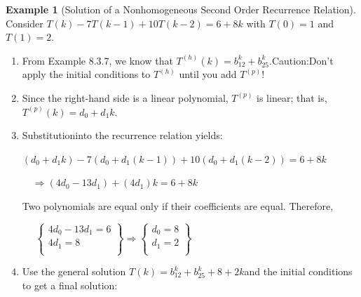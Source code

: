 \documentclass[10pt,]{book}
\theoremstyle{plain}
\theoremstyle{definition}
\theoremstyle{definition}
\theoremstyle{definition}
\newtheorem{example}[theorem]{Example}
\theoremstyle{definition}
\numberwithin{equation}{section}
\begin{document}
\begin{example}[Solution of a Nonhomogeneous Second Order Recurrence Relation]\label{ex-nhrr-solution-example-2}
 Consider \(T(k) - 7T(k - 1) + 10T(k - 2) = 6 + 8k\) with \(T(0) = 1\) and \(T(1) = 2\).%
\par
\leavevmode%
\begin{enumerate}[label=\alph*]
\item\hypertarget{li-58}{}From Example 8.3.7, we know that \(T^{(h)}(k)=b_12^k+ b_25^k\).Caution:Don't apply the initial conditions to \(T^{(h)}\) until you
add \(T^{(p)}\)!%
\item\hypertarget{li-59}{}Since the right-hand side is a linear polynomial, \(T^{(p)}\) is linear; that is, \(T^{(p)}(k)=d_0+d_1k\).%
\item\hypertarget{li-60}{}Substitutioninto the recurrence relation yields:

\(\left(d_0+d_1k\right)-7\left(d_0+d_1(k-1)\right)+10\left(d_0+d_1(k-2)\right)=6+8k\)

\(\quad\)\(\Rightarrow  \left(4d_0-13d_1\right)+ \left(4d_1\right)k = 6 + 8 k\)

Two polynomials are equal only if their coefficients are equal. Therefore,



\(\quad\) \(\left\{
\begin{array}{c}
 4d_0-13d_1=6 \\
 4d_1=8 \\
\end{array}
\right\}\Rightarrow \left\{
\begin{array}{c}
 d_0=8 \\
 d_1=2 \\
\end{array}
\right\}\)%
\item\hypertarget{li-61}{}Use the general solution \(T(k) =b_12^k+ b_25^k+8+2k\)and the initial conditions to get a final solution:


\end{enumerate}
\end{example}
\end{document}
